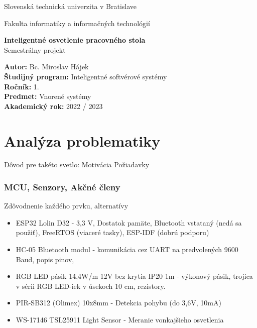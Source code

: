 \documentclass[12pt, a4paper]{article}
\begin{document}
\begin{titlepage}
{\centering
    {\Large Slovenská technická univerzita v Bratislave}\par
    {\Large Fakulta informatiky a informačných technológií}\par
    \vspace{\medskipamount}
    \vfill
    \LARGE \textbf{Inteligentné osvetlenie pracovného stola} \\
    \vspace{0.7\bigskipamount}
    {\Large Semestrálny projekt}\par
    \vfill
}
\normalsize    
\begin{flushleft}
\textbf{Autor:} Bc. Miroslav Hájek \\
\textbf{Študijný program:} Inteligentné softvérové systémy \\
\textbf{Ročník:} 1. \\
\textbf{Predmet:} Vnorené systémy \\
\textbf{Akademický rok:} 2022 / 2023 \\
\end{flushleft}
\end{titlepage}

\thispagestyle{empty}


\tableofcontents
\newpage

\setcounter{page}{1}

\section{Analýza problematiky}
Dôvod pre takéto svetlo: Motivácia
Požiadavky

\subsubsection{MCU, Senzory, Akčné členy}
Zdôvodnenie každého prvku, alternatívy
\begin{itemize}
\item ESP32 Lolin D32 - 3,3 V, Dostatok pamäte, Bluetooth vstataný (nedá sa použiť), FreeRTOS (viaceré tasky), ESP-IDF (dobrú podporu)
\item HC-05 Bluetooth modul - komunikácia cez UART na predvolených 9600 Baud, popis pinov, 
\item RGB LED pásik 14,4W/m 12V bez krytia IP20 1m - výkonový pásik, trojica v sérii RGB LED-iek v úsekoch 10 cm, rezistory. 
\item PIR-SB312 (Olimex) 10x8mm - Detekcia pohybu (do 3,6V, 10mA) 
\item WS-17146 TSL25911 Light Sensor  - Meranie vonkajšieho osvetlenia
\end{itemize}
\end{document}
